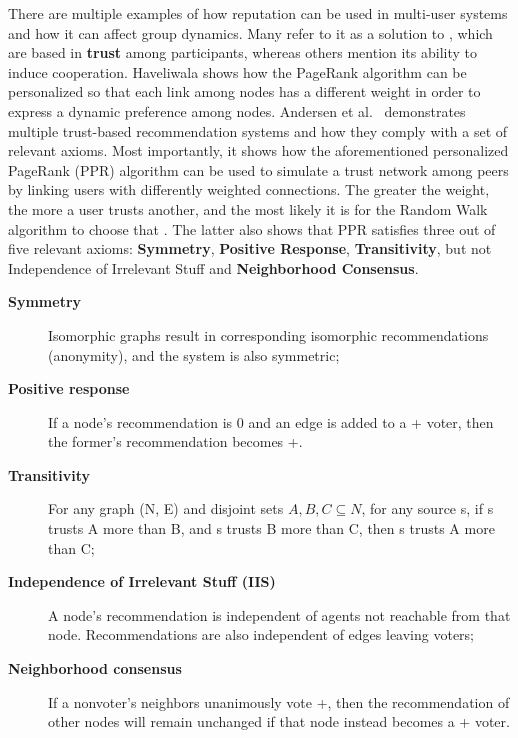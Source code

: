 There are multiple examples of how reputation can be used in multi-user systems and how it can affect group dynamics. Many refer to it as a solution to , which are based in \textbf{trust} among participants, whereas others mention its ability to induce cooperation. Haveliwala \cite{Haveliwala2003} shows how the PageRank algorithm can be personalized so that each link among nodes has a different weight in order to express a dynamic preference among nodes. Andersen et al.\ \cite{Andersen2008} demonstrates multiple trust-based recommendation systems and how they comply with a set of relevant axioms. Most importantly, it shows how the aforementioned personalized PageRank (PPR) algorithm can be used to simulate a trust network among peers by linking users with differently weighted connections. The greater the weight, the more a user trusts another, and the most likely it is for the Random Walk algorithm to choose that . The latter also shows that PPR satisfies three out of five relevant axioms: \textbf{Symmetry}, \textbf{Positive Response}, \textbf{Transitivity}, but not Independence of Irrelevant Stuff and \textbf{Neighborhood Consensus}.
\begin{description}
    \item[\textbf{Symmetry}] Isomorphic graphs result in corresponding isomorphic recommendations (anonymity), and the system is also symmetric;
    \item[\textbf{Positive response}] If a node’s recommendation is 0 and an edge is added to a + voter, then the former’s recommendation becomes +.
    \item[\textbf{Transitivity}] For any graph (N, E) and disjoint sets $ A, B, C \subseteq N $, for any source s, if s trusts A more than B, and s trusts B more than C, then s trusts A more than C;
    \item[\textbf{Independence of Irrelevant Stuﬀ (IIS)}] A node’s recommendation is independent of agents not reachable from that node. Recommendations are also independent of edges leaving voters;
    \item[\textbf{Neighborhood consensus}] If a nonvoter’s neighbors unanimously vote +, then the recommendation of other nodes will remain unchanged if that node instead becomes a + voter.
\end{description}

